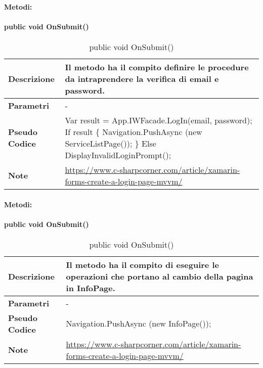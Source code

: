 \paragraph{Metodi:}
\paragraph{public void OnSubmit()}
\begin{center}
    \begin{longtable}{|p{3cm}|p{9cm}|}%
    \caption{public void OnSubmit()}
    \endfirsthead
    \endhead
    \hline
    \textbf{Descrizione} & Il metodo ha il compito definire le procedure da intraprendere la verifica di email e password.\\
    \hline
    \textbf{Parametri} &      
    -
    \\
    \hline
    \textbf{Pseudo Codice} & 
    Var result = App.IWFacade.LogIn(email, password);\newline
    If result \{\newline
        Navigation.PushAsync (new ServiceListPage());\newline
    \}\newline
    Else DisplayInvalidLoginPrompt();\newline
    \\
    \hline
    \textbf{Note} & 
    \url{https://www.c-sharpcorner.com/article/xamarin-forms-create-a-login-page-mvvm/}
    \\
    \hline
    \end{longtable}
\end{center}


\paragraph{Metodi:}
\paragraph{public void OnSubmit()}
\begin{center}
    \begin{longtable}{|p{3cm}|p{9cm}|}%
    \caption{public void OnSubmit()}
    \endfirsthead
    \endhead
    \hline
    \textbf{Descrizione} & Il metodo ha il compito di eseguire le operazioni che portano al cambio della pagina in InfoPage.\\
    \hline
    \textbf{Parametri} &      
    -
    \\
    \hline
    \textbf{Pseudo Codice} & 
    Navigation.PushAsync (new InfoPage());
    \\
    \hline
    \textbf{Note} & 
    \url{https://www.c-sharpcorner.com/article/xamarin-forms-create-a-login-page-mvvm/}
    \\
    \hline
    \end{longtable}
\end{center}


